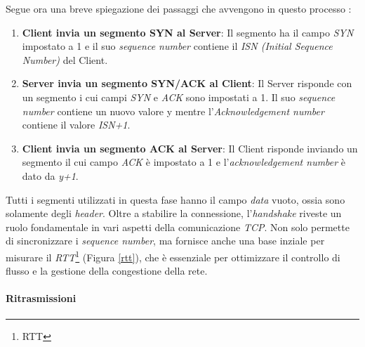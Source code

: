 \noindent Segue ora una breve spiegazione dei passaggi che avvengono in questo processo : 

\begin{enumerate}
    \item \textbf{Client invia un segmento SYN al Server}: Il segmento ha il campo \emph{SYN} impostato a 1 e il suo \emph{sequence number} contiene il \emph{ISN (Initial Sequence Number)} del Client.
    \item \textbf{Server invia un segmento SYN/ACK al Client}: Il Server risponde con un segmento i cui campi \emph{SYN} e \emph{ACK} sono impostati a 1. Il suo \emph{sequence number} contiene un nuovo valore y mentre l'\emph{Acknowledgement number} contiene il valore \emph{ISN+1}.
    \item \textbf{Client invia un segmento ACK al Server}: Il Client risponde inviando un segmento il cui campo \emph{ACK} è impostato a 1 e l'\emph{acknowledgement number} è dato da \emph{y+1}.
\end{enumerate}

\noindent Tutti i segmenti utilizzati in questa fase hanno il campo \emph{data} vuoto, ossia sono solamente degli \emph{header}. 
Oltre a stabilire la connessione, l'\emph{handshake} riveste un ruolo fondamentale in vari aspetti della comunicazione \emph{TCP}.
Non solo permette di sincronizzare i \emph{sequence number}, ma fornisce anche una base inziale per misurare il \emph{RTT}\footnote{\gls{RTT}} (Figura \ref{rtt}), che è essenziale per ottimizzare il controllo di flusso e la gestione della congestione della rete.

\paragraph{ Ritrasmissioni }


